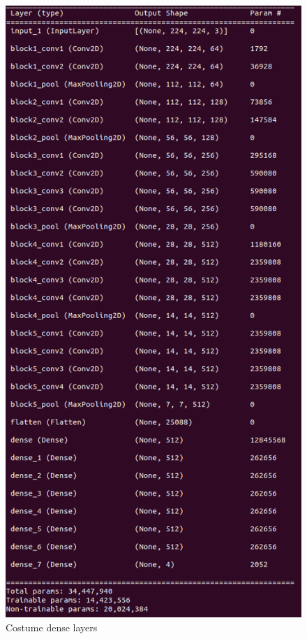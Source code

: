 \documentclass{article}
\begin{document}
\begin{figure}
  \centering
  \includegraphics[scale=0.35]{Fig1}
  \caption{Costume dense layers}
  \label{Fig1}
\end{figure}
\end{document}
